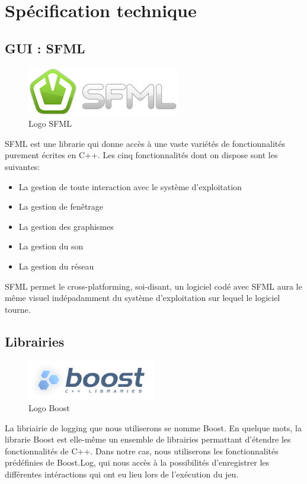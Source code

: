 \section{Spécification technique}

\subsection{GUI : SFML}
\begin{figure}[h]
	\centering
	\includegraphics{SFML_logo.png}
	\caption{Logo SFML}
	\label{fig:logo_sfml}
\end{figure}
SFML est une librarie qui donne accès à une vaste variétés de fonctionnalités purement écrites en C++. Les cinq fonctionnalités dont on dispose sont les suivantes:
\begin{itemize}
	\item La gestion de toute interaction avec le système d'exploitation
	\item La gestion de fenêtrage
	\item La gestion des graphismes
	\item La gestion du son
	\item La gestion du réseau
\end{itemize}

SFML permet le cross-platforming, soi-disant, un logiciel codé avec SFML aura le même visuel indépadamment du système d'exploitation sur lequel le logiciel tourne.

\subsection{Librairies}
\begin{figure}[h]
	\centering
	\includegraphics[width=0.5\textwidth]{Boost_logo.png}
	\caption{Logo Boost}
	\label{fig:logo_boost}
\end{figure}
La libriairie de logging que nous utiliserons se nomme Boost. En quelque mots, la librarie Boost est elle-même un ensemble de librairies permattant d'étendre les fonctionnalités de C++. Dans notre cas, nous utiliserons les fonctionnalités prédéfinies de Boost.Log, qui nous accès à la possibilités d'enregistrer les différentes intéractions qui ont eu lieu lors de l'exécution du jeu.

